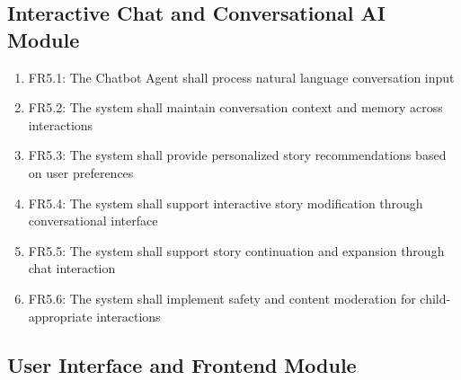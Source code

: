 \subsection{Interactive Chat and Conversational AI Module}

\begin{enumerate}
    \item FR5.1: The Chatbot Agent shall process natural language conversation input
    \item FR5.2: The system shall maintain conversation context and memory across interactions
    \item FR5.3: The system shall provide personalized story recommendations based on user preferences
    \item FR5.4: The system shall support interactive story modification through conversational interface
    \item FR5.5: The system shall support story continuation and expansion through chat interaction
    \item FR5.6: The system shall implement safety and content moderation for child-appropriate interactions
\end{enumerate}

\subsection{User Interface and Frontend Module}

